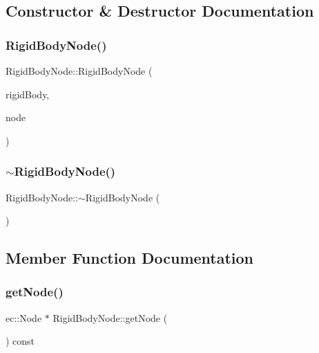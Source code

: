 \subsection{Constructor \& Destructor Documentation}
\mbox{\label{class_rigid_body_node_a8ce6244b5ddff6ffcae6273e2613ec7c}} 
\subsubsection{\texorpdfstring{Rigid\+Body\+Node()}{RigidBodyNode()}}
{\footnotesize\ttfamily Rigid\+Body\+Node\+::\+Rigid\+Body\+Node (\begin{DoxyParamCaption}\item[{r3\+::\+Rigid\+Body $\ast$}]{rigid\+Body,  }\item[{ec\+::\+Node $\ast$}]{node }\end{DoxyParamCaption})}

\mbox{\label{class_rigid_body_node_a9fab17e299f7e471c726d644cb65aedf}} 
\subsubsection{\texorpdfstring{$\sim$\+Rigid\+Body\+Node()}{~RigidBodyNode()}}
{\footnotesize\ttfamily Rigid\+Body\+Node\+::$\sim$\+Rigid\+Body\+Node (\begin{DoxyParamCaption}{ }\end{DoxyParamCaption})\hspace{0.3cm}{\ttfamily [default]}}



\subsection{Member Function Documentation}
\mbox{\label{class_rigid_body_node_a1004482a1aa31b8bd7df515815b0fc59}} 
\subsubsection{\texorpdfstring{get\+Node()}{getNode()}}
{\footnotesize\ttfamily ec\+::\+Node $\ast$ Rigid\+Body\+Node\+::get\+Node (\begin{DoxyParamCaption}{ }\end{DoxyParamCaption}) const}



